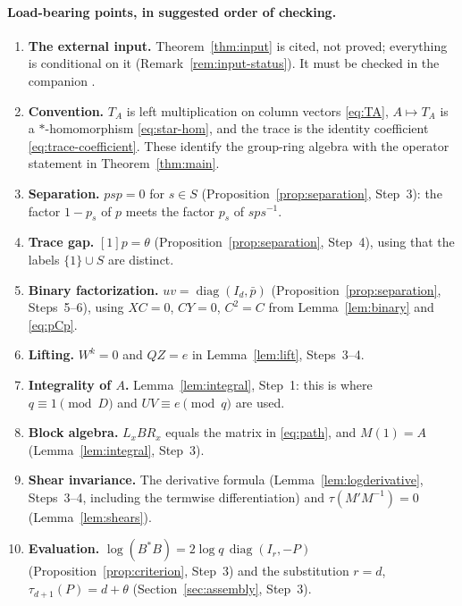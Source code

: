 \documentclass[11pt]{article}
\theoremstyle{remark}
\numberwithin{equation}{section}
\newcommand{\diag}{\operatorname{diag}}
\begin{document}
\paragraph{Load-bearing points, in suggested order of checking.}
\begin{enumerate}[leftmargin=2.2em]
\item \textbf{The external input.} Theorem~\ref{thm:input} is cited, not proved; everything is conditional on it (Remark~\ref{rem:input-status}). It must be checked in the companion \cite{CharacteristicTwo}.
\item \textbf{Convention.} $T_A$ is left multiplication on column vectors \eqref{eq:TA}, $A\mapsto T_A$ is a $*$-homomorphism \eqref{eq:star-hom}, and the trace is the identity coefficient \eqref{eq:trace-coefficient}. These identify the group-ring algebra with the operator statement in Theorem~\ref{thm:main}.
\item \textbf{Separation.} $psp=0$ for $s\in S$ (Proposition~\ref{prop:separation}, Step~3): the factor $1-p_s$ of $p$ meets the factor $p_s$ of $sps^{-1}$.
\item \textbf{Trace gap.} $[1]p=\theta$ (Proposition~\ref{prop:separation}, Step~4), using that the labels $\{1\}\cup S$ are distinct.
\item \textbf{Binary factorization.} $uv=\diag(I_d,\bar p)$ (Proposition~\ref{prop:separation}, Steps~5--6), using $XC=0$, $CY=0$, $C^2=C$ from Lemma~\ref{lem:binary} and \eqref{eq:pCp}.
\item \textbf{Lifting.} $W^k=0$ and $QZ=e$ in Lemma~\ref{lem:lift}, Steps~3--4.
\item \textbf{Integrality of $A$.} Lemma~\ref{lem:integral}, Step~1: this is where $q\equiv1\pmod D$ and $UV\equiv e\pmod q$ are used.
\item \textbf{Block algebra.} $L_xBR_x$ equals the matrix in \eqref{eq:path}, and $M(1)=A$ (Lemma~\ref{lem:integral}, Step~3).
\item \textbf{Shear invariance.} The derivative formula (Lemma~\ref{lem:logderivative}, Steps~3--4, including the termwise differentiation) and $\tau(M'M^{-1})=0$ (Lemma~\ref{lem:shears}).
\item \textbf{Evaluation.} $\log(B^*B)=2\log q\,\diag(I_r,-P)$ (Proposition~\ref{prop:criterion}, Step~3) and the substitution $r=d$, $\tau_{d+1}(P)=d+\theta$ (Section~\ref{sec:assembly}, Step~3).
\end{enumerate}

\begingroup
\raggedright


\endgroup
\end{document}
